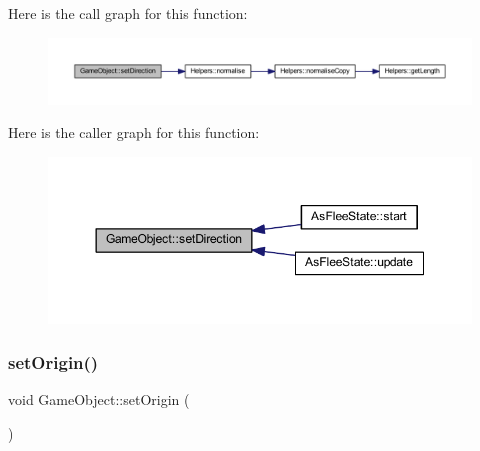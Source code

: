 Here is the call graph for this function\+:
\nopagebreak
\begin{figure}[H]
\begin{center}
\leavevmode
\includegraphics[width=350pt]{class_game_object_a82170ca0b119ea4096a939fd6f7c937e_cgraph}
\end{center}
\end{figure}
Here is the caller graph for this function\+:
\nopagebreak
\begin{figure}[H]
\begin{center}
\leavevmode
\includegraphics[width=350pt]{class_game_object_a82170ca0b119ea4096a939fd6f7c937e_icgraph}
\end{center}
\end{figure}
\mbox{\label{class_game_object_a939b26e569a42ec129e57540920e859c}} 
\subsubsection{\texorpdfstring{set\+Origin()}{setOrigin()}}
{\footnotesize\ttfamily void Game\+Object\+::set\+Origin (\begin{DoxyParamCaption}{ }\end{DoxyParamCaption})\hspace{0.3cm}{\ttfamily [protected]}}

